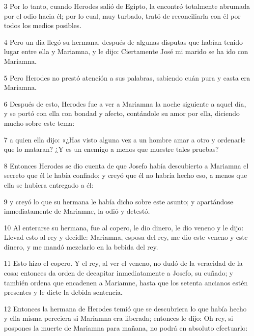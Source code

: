 \par 3 Por lo tanto, cuando Herodes salió de Egipto, la encontró totalmente abrumada por el odio hacia él; por lo cual, muy turbado, trató de reconciliarla con él por todos los medios posibles.

\par 4 Pero un día llegó su hermana, después de algunas disputas que habían tenido lugar entre ella y Mariamna, y le dijo: Ciertamente José mi marido se ha ido con Mariamna.

\par 5 Pero Herodes no prestó atención a sus palabras, sabiendo cuán pura y casta era Mariamna.

\par 6 Después de esto, Herodes fue a ver a Mariamna la noche siguiente a aquel día, y se portó con ella con bondad y afecto, contándole su amor por ella, diciendo mucho sobre este tema:

\par 7 a quien ella dijo: «¿Has visto alguna vez a un hombre amar a otro y ordenarle que lo mataran? ¿Y es un enemigo a menos que muestre tales pruebas?

\par 8 Entonces Herodes se dio cuenta de que Josefo había descubierto a Mariamna el secreto que él le había confiado; y creyó que él no habría hecho eso, a menos que ella se hubiera entregado a él:

\par 9 y creyó lo que su hermana le había dicho sobre este asunto; y apartándose inmediatamente de Mariamne, la odió y detestó.

\par 10 Al enterarse su hermana, fue al copero, le dio dinero, le dio veneno y le dijo: Llevad esto al rey y decidle: Mariamna, esposa del rey, me dio este veneno y este dinero, y me mandó mezclarlo en la bebida del rey.

\par 11 Esto hizo el copero. Y el rey, al ver el veneno, no dudó de la veracidad de la cosa: entonces da orden de decapitar inmediatamente a Josefo, su cuñado; y también ordena que encadenen a Mariamne, hasta que los setenta ancianos estén presentes y le dicte la debida sentencia.

\par 12 Entonces la hermana de Herodes temió que se descubriera lo que había hecho y ella misma pereciera si Mariamna era liberada; entonces le dijo: Oh rey, si pospones la muerte de Mariamna para mañana, no podrá en absoluto efectuarlo:

